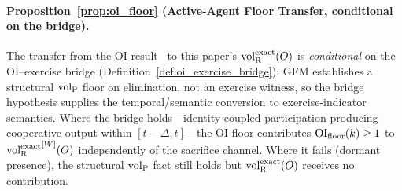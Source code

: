 \paragraph{Proposition~\ref{prop:oi_floor}
(Active-Agent Floor Transfer, conditional on the bridge).}
The transfer from the OI
result~\citep[Corollary~2.1]{lasser2026horizon} to this
paper's ${\operatorname{vol}_{\mathrm{R}}^{\mathrm{exact}}}(O)$ is \emph{conditional} on the
OI--exercise bridge (Definition~\ref{def:oi_exercise_bridge}):
GFM establishes a structural ${\operatorname{vol}_{\mathrm{P}}}$ floor on elimination,
not an exercise witness, so the bridge hypothesis supplies
the temporal/semantic conversion to exercise-indicator
semantics.  Where the bridge
holds---identity-coupled participation producing cooperative
output within $[t-\Delta, t]$---the OI floor contributes
$\mathrm{OI}_{\mathrm{floor}}(k) \geq 1$ to ${\operatorname{vol}_{\mathrm{R}}^{\mathrm{exact}}}^{[W]}(O)$ independently of
the sacrifice channel.  Where it fails (dormant presence),
the structural ${\operatorname{vol}_{\mathrm{P}}}$ fact still holds but ${\operatorname{vol}_{\mathrm{R}}^{\mathrm{exact}}}(O)$
receives no contribution.
